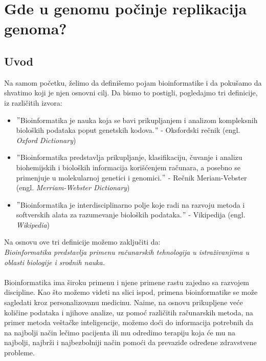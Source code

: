 \chapter{Gde u genomu počinje replikacija genoma?}
\section{Uvod}
\label{sec:uvod}

Na samom početku, želimo da definišemo pojam bioinformatike i da pokušamo da shvatimo koji je njen osnovni cilj. Da bismo to postigli, pogledajmo tri definicije, iz različitih izvora:

\begin{itemize}
  \item $"$Bioinformatika je nauka koja se bavi prikupljanjem i analizom kompleksnih bioloških podataka poput genetskih kodova.$"$ - Oksfordski rečnik (engl. \textit{Oxford Dictionary})
  \item $"$Bioinformatika predstavlja prikupljanje, klasifikaciju, čuvanje i analizu biohemijskih i bioloških informacija korišćenjem računara, a posebno se primenjuje u molekularnoj genetici i genomici.$"$ - Rečnik Meriam-Vebster (engl. \textit{Merriam-Webster Dictionary}) 
 \item $"$Bioinformatika je interdisciplinarno polje koje radi na razvoju metoda i softverskih alata za razumevanje bioloških podataka.$"$ - Vikipedija (engl. \textit{Wikipedia}) 
\end{itemize}

Na osnovu ove tri definicije možemo zaključiti da:\\
\textit{Bioinformatika predstavlja primenu računarskih tehnologija u istraživanjima u oblasti biologije i srodnih nauka.}\\\\
Bioinformatika ima široku primenu i njene primene rastu zajedno sa razvojem discipline. Kao što možemo videti na slici ispod, primena bioinformatike se može sagledati kroz personalizovanu medicinu. Naime, na osnovu prikupljene veće količine podataka i njihove analize, uz pomoć različitih računarskih metoda, na primer metoda veštačke inteligencije, možemo doći do informacija potrebnih da na najbolji način lečimo pacijenta ili mu odredimo terapiju koja će mu na najbolji, najbrži i najbezbolniji način pomoći da prevaziđe određene zdravstvene probleme.  \\

